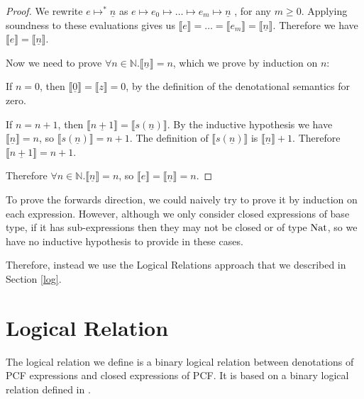 \begin{proof}
We rewrite $e \mapsto^* \underline{n}$ as $e \mapsto e_0 \mapsto \dots \mapsto e_m \mapsto \underline{n}$ , for any $m \geq 0$. Applying soundness to these evaluations gives us $\llbracket e\rrbracket = \dots = \llbracket e_m \rrbracket = \llbracket \underline{n} \rrbracket$. Therefore we have $\llbracket  e \rrbracket = \llbracket \underline{n} \rrbracket$.

Now we need to prove $\forall n \in \mathbb{N}. \llbracket \underline{n} \rrbracket = n$, which we prove by induction on $n$:

If $n = 0$, then $\llbracket \underline{0} \rrbracket = \llbracket z \rrbracket = 0$, by the definition of the denotational semantics for zero.


If $n = n + 1$, then $\llbracket \underline{n + 1} \rrbracket = \llbracket s(\underline{n}) \rrbracket$. By the inductive hypothesis we have $\llbracket \underline{n} \rrbracket = n$, so $\llbracket s(\underline{n}) \rrbracket = n + 1$. The definition of $\llbracket s(\underline{n}) \rrbracket$ is $\llbracket  \underline{n} \rrbracket + 1$. Therefore $\llbracket \underline{n + 1} \rrbracket = n + 1$.


Therefore $\forall n \in \mathbb{N}. \llbracket \underline{n} \rrbracket  = n$, so $\llbracket e \rrbracket =  \llbracket \underline{n} \rrbracket  = n$.

\end{proof}

To prove the forwards direction, we could naively try to prove it by induction on each expression. However,  although we only consider closed expressions of base type, if it has sub-expressions then they may not be closed or of type $\operatorname{Nat}$, so we have no inductive hypothesis to provide in these cases.

Therefore, instead we use the Logical Relations approach that we described in Section \ref{log}.

\section{Logical Relation}\label{const}
The logical relation we define is a binary logical relation between denotations of PCF expressions and closed expressions of PCF. It is based on a binary logical relation defined in \citep{Streicher06}. 

